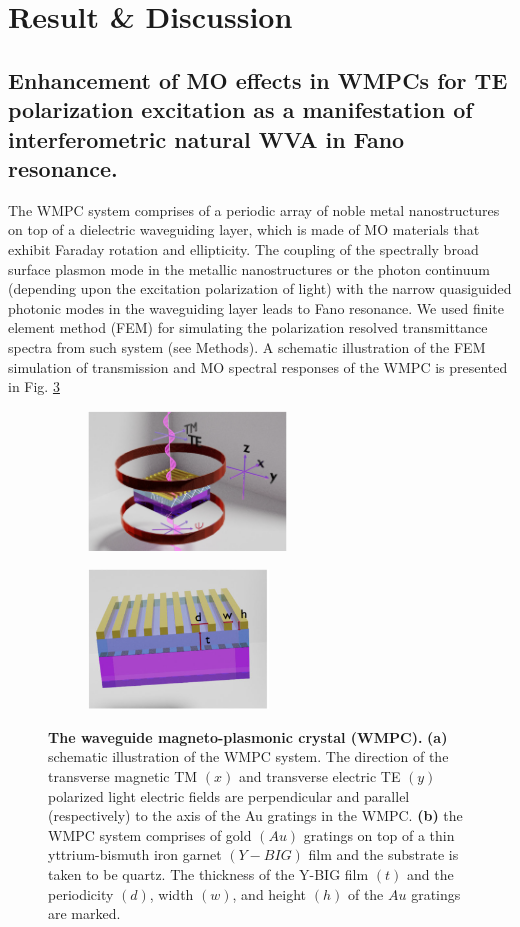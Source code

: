 \documentclass[13pt]{article}
\begin{document}
\section{Result \& Discussion}
\noindent
\par 
\subsection{Enhancement of MO effects in WMPCs for TE polarization excitation as a manifestation of interferometric natural WVA in Fano resonance.}
\noindent
\par
	The WMPC system comprises of a periodic array of noble metal nanostructures on top of a dielectric waveguiding layer, which is made of MO materials that exhibit Faraday rotation and ellipticity. The coupling of the spectrally broad surface plasmon mode in the metallic nanostructures or the photon continuum (depending upon the excitation polarization of light) with the narrow quasiguided photonic modes in the waveguiding layer leads to Fano resonance. We used finite element method (FEM) for simulating the polarization resolved transmittance spectra from such system (see Methods). A schematic illustration of the FEM simulation of transmission and MO spectral responses of the WMPC is presented in Fig. \ref{fig:figure1} 
\begin{figure}[hbt!]
	\centering
	\begin{subfigure}[]{.49 \linewidth}
		\centering
		\includegraphics[width=\linewidth, height=140px]{Figures/figure1a.png}
		\caption{}
		\label{}
	\end{subfigure}
	\hfill
	\begin{subfigure}[]{.49 \linewidth}
		\centering
		\includegraphics[width=\linewidth, height=140px]{Figures/figure1b.png}
		\caption{}
		\label{}
	\end{subfigure}
	\caption{\textbf{The waveguide magneto-plasmonic crystal (WMPC).} \textbf{(a)} schematic illustration of the WMPC system. The direction of the transverse magnetic TM $(x)$ and transverse electric TE $(y)$ polarized light electric fields are perpendicular and parallel (respectively) to the axis of the Au gratings in the WMPC. \textbf{(b)} the WMPC system comprises of gold $(Au)$ gratings on top of a thin yttrium-bismuth iron garnet $(Y-BIG)$ film and the substrate is taken to be quartz. The thickness of the Y-BIG film $(t)$ and the periodicity $(d)$, width $(w)$, and height $(h)$ of the $Au$ gratings are marked.}
	\label{fig:figure1}
\end{figure}
\end{document}
